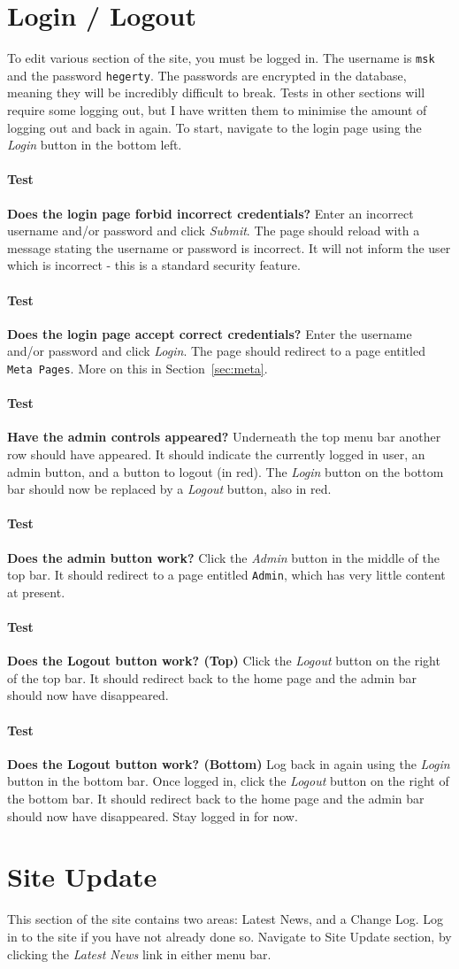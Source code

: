 \documentclass[12pt]{article}
\newcounter{Test}
\newcommand{\test}[1]{%
\stepcounter{Test}%
\paragraph{Test \theTest} \textbf{#1} }
\begin{document}
\section{Login / Logout}\label{sec:user}
To edit various section of the site, you must be logged in. The username is \texttt{msk} and the password \texttt{hegerty}. The passwords are encrypted in the database, meaning they will be incredibly difficult to break. Tests in other sections will require some logging out, but I have written them to minimise the amount of logging out and back in again. To start, navigate to the login page using the \textit{Login} button in the bottom left.

\test{Does the login page forbid incorrect credentials?}
Enter an incorrect username and/or password and click \textit{Submit}. The page should reload with a message stating the username or password is incorrect. It will not inform the user which is incorrect - this is a standard security feature.

\test{Does the login page accept correct credentials?}
Enter the username and/or password and click \textit{Login}. The page should redirect to a page entitled \texttt{Meta Pages}. More on this in Section~\ref{sec:meta}.

\test{Have the admin controls appeared?}
Underneath the top menu bar another row should have appeared. It should indicate the currently logged in user, an admin button, and a button to logout (in red). The \textit{Login} button on the bottom bar should now be replaced by a \textit{Logout} button, also in red.

\test{Does the admin button work?}
Click the \textit{Admin} button in the middle of the top bar. It should redirect to a page entitled \texttt{Admin}, which has very little content at present.

\test{Does the Logout button work? (Top)}
Click the \textit{Logout} button on the right of the top bar. It should redirect back to the home page and the admin bar should now have disappeared.

\test{Does the Logout button work? (Bottom)}
Log back in again using the \textit{Login} button in the bottom bar. Once logged in, click the \textit{Logout} button on the right of the bottom bar. It should redirect back to the home page and the admin bar should now have disappeared. Stay logged in for now.

\section{Site Update}\label{sec:siteUpdate}
This section of the site contains two areas: Latest News, and a Change Log. Log in to the site if you have not already done so. Navigate to Site Update section, by clicking the \textit{Latest News} link in either menu bar.
\end{document}
